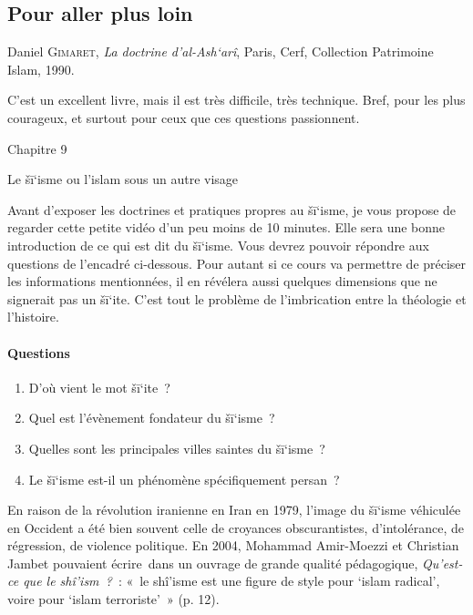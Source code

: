 
\subsection{Pour aller plus loin}

Daniel \textsc{Gimaret}, \emph{La doctrine d'al-Ash`arî}, Paris, Cerf,
Collection Patrimoine Islam, 1990.

C'est un excellent livre, mais il est très difficile, très technique.
Bref, pour les plus courageux, et surtout pour ceux que ces questions
passionnent.

Chapitre 9

Le šī`isme ou l'islam sous un autre visage

Avant d'exposer les doctrines et pratiques propres au šī`isme, je vous
propose de regarder cette petite vidéo d'un peu moins de 10 minutes.
Elle sera une bonne introduction de ce qui est dit du šī`isme. Vous
devrez pouvoir répondre aux questions de l'encadré ci-dessous. Pour
autant si ce cours va permettre de préciser les informations
mentionnées, il en révélera aussi quelques dimensions que ne signerait
pas un šī`ite. C'est tout le problème de l'imbrication entre la
théologie et l'histoire.

\paragraph{Questions}

\begin{enumerate}
\def\labelenumi{\arabic{enumi}.}
\item
  D'où vient le mot šī`ite~?
\item
  Quel est l'évènement fondateur du šī`isme~?
\item
  Quelles sont les principales villes saintes du šī`isme~?
\item
  Le šī`isme est-il un phénomène spécifiquement persan~?
\end{enumerate}


En raison de la révolution iranienne en Iran en 1979, l'image du šī`isme
véhiculée en Occident a été bien souvent celle de croyances
obscurantistes, d'intolérance, de régression, de violence politique. En
2004, Mohammad Amir-Moezzi et Christian Jambet pouvaient écrire~dans un
ouvrage de grande qualité pédagogique, \emph{Qu'est-ce que le
shî'ism~?}~: «~le shî'isme est une figure de style pour `islam radical',
voire pour `islam terroriste'~» (p. 12).

